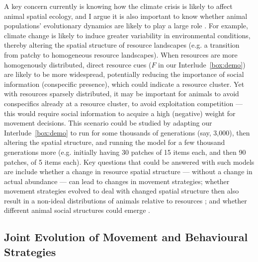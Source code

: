 A key concern currently is knowing how the climate crisis is likely to affect animal spatial ecology, and I argue it is also important to know whether animal populations' evolutionary dynamics are likely to play a large role \parencite[e.g.][]{botero2015}.
For example, climate change is likely to induce greater variability in environmental conditions, thereby altering the spatial structure of resource landscapes (e.g. a transition from patchy to homogeneous resource landscapes).
When resources are more homogenously distributed, direct resource cues ($F$ in our Interlude~\ref{box:demo}) are likely to be more widespread, potentially reducing the importance of social information (conspecific presence), which could indicate a resource cluster.
Yet with resources sparsely distributed, it may be important for animals to avoid conspecifics already at a resource cluster, to avoid exploitation competition --- this would require social information to acquire a high (negative) weight for movement decisions.
This scenario could be studied by adapting our Interlude~\ref{box:demo} to run for some thousands of generations (say, 3,000), then altering the spatial structure, and running the model for a few thousand generations more (e.g. initially having 30 patches of 15 items each, and then 90 patches, of 5 items each).
Key questions that could be answered with such models are include whether a change in resource spatial structure --- without a change in actual abundance --- can lead to changes in movement strategies; whether movement strategies evolved to deal with changed spatial structure then also result in a non-ideal distributions of animals relative to resources \parencite[a test of][]{fretwell1970,parker1978}; and whether different animal social structures could emerge \parencite[see a review in][]{webber2022,tanner2012}.

\subsection*{Joint Evolution of Movement and Behavioural Strategies}

